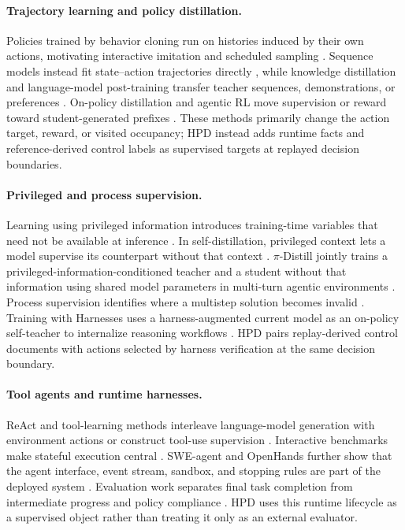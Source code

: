 \documentclass{article}
\newcommand{\hpd}{\textsc{HPD}}
\begin{document}
\paragraph{Trajectory learning and policy distillation.}
Policies trained by behavior cloning run on histories induced by their own actions,
motivating interactive imitation and scheduled sampling
\citep{ross2011reduction,bengio2015scheduled}. Sequence models instead fit
state--action trajectories directly \citep{chen2021decision,janner2021trajectory},
while knowledge distillation and language-model post-training transfer teacher
sequences, demonstrations, or preferences
\citep{hinton2015distilling,kim2016sequence,ouyang2022training,
rafailov2023direct}. On-policy distillation and agentic RL move supervision or
reward toward student-generated prefixes
\citep{agarwal2024onpolicy,shao2024deepseekmath,deepseekai2025r1}. These methods
primarily change the action target, reward, or visited occupancy; \hpd{} instead
adds runtime facts and reference-derived control labels as supervised targets
at replayed decision boundaries.

\paragraph{Privileged and process supervision.}
Learning using privileged information introduces training-time variables that
need not be available at inference
\citep{vapnik2009new,lopezpaz2016unifying}. In self-distillation, privileged
context lets a model supervise its counterpart without that context
\citep{zhao2026selfdistilled}. $\pi$-Distill jointly trains a privileged-information-conditioned teacher
and a student without that information using shared model parameters
in multi-turn agentic environments \citep{penaloza2026privileged}. Process supervision identifies where a multistep solution becomes invalid \citep{uesato2022solving,lightman2024verify}. Training with Harnesses
uses a harness-augmented current model as an on-policy self-teacher to
internalize reasoning workflows \citep{zhao2026trainingharnesses}. HPD pairs
replay-derived control documents with actions selected by harness verification
at the same decision boundary.

\paragraph{Tool agents and runtime harnesses.}
ReAct and tool-learning methods interleave language-model generation with
environment actions or construct tool-use supervision
\citep{yao2023react,schick2023toolformer,yang2023gpt4tools,qin2024toolllm}.
Interactive benchmarks make stateful execution central
\citep{shridhar2021alfworld,yao2022webshop,zhou2024webarena,
liu2024agentbench,mialon2024gaia,jimenez2024swebench}. SWE-agent and OpenHands
further show that the agent interface, event stream, sandbox, and stopping rules
are part of the deployed system \citep{yang2024sweagent,wang2025openhands}.
Evaluation work separates final task completion from intermediate progress and
policy compliance \citep{ma2024agentboard,yao2025taubench,lu2025toolsandbox}.
\hpd{} uses this runtime lifecycle as a supervised object rather than treating
it only as an external evaluator.
\end{document}
